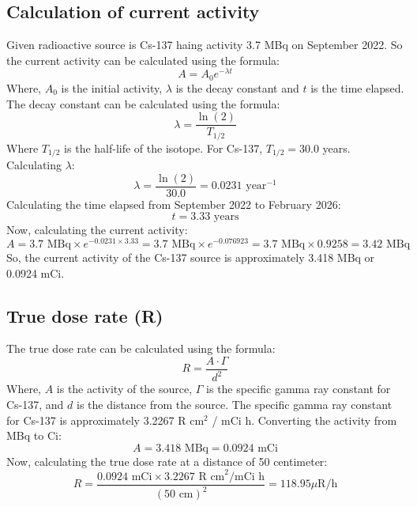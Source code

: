 \subsection{Calculation of current activity}
Given radioactive source is Cs-137 haing activity 3.7 MBq on September 2022. So the current activity can be calculated using the formula:
\begin{equation}
    A = A_0 e^{-\lambda t}
\end{equation}
Where, $A_0$ is the initial activity, $\lambda$ is the decay constant and $t$ is the time elapsed. The decay constant can be calculated using the formula:  
\begin{equation}
    \lambda = \frac{\ln(2)}{T_{1/2}}
\end{equation}
Where $T_{1/2}$ is the half-life of the isotope. For Cs-137, $T_{1/2} = 30.0$ years.
Calculating $\lambda$:
\begin{equation}
    \lambda = \frac{\ln(2)}{30.0} = 0.0231 \text{ year}^{-1}
\end{equation}
Calculating the time elapsed from September 2022 to February 2026:
\begin{equation}
    t = 3.33 \text{ years}
\end{equation}
Now, calculating the current activity:
\begin{equation}
    A = 3.7 \text{ MBq} \times e^{-0.0231 \times 3.33} = 3.7 \text{ MBq} \times e^{-0.076923} = 3.7 \text{ MBq} \times 0.9258 = 3.42 \text{ MBq}
\end{equation}
So, the current activity of the Cs-137 source is approximately 3.418 MBq or 0.0924 mCi.
\subsection{True dose rate (R)}
The true dose rate can be calculated using the formula:
\begin{equation}
    R = \frac{A \cdot \Gamma}{d^2}
\end{equation}
Where, $A$ is the activity of the source, $\Gamma$ is the specific gamma ray constant for Cs-137, and $d$ is the distance from the source. The specific gamma ray constant for Cs-137 is approximately 3.2267 R cm$^2$ / mCi h. Converting the activity from MBq to Ci:
\begin{equation}
    A = 3.418 \text{ MBq} = 0.0924 \text{ mCi}
\end{equation}
Now, calculating the true dose rate at a distance of 50 centimeter:
\begin{equation}
    R = \frac{0.0924 \text{ mCi} \times 3.2267 \text{ R cm}^2/\text{mCi h}}{(50 \text{ cm})^2} = 118.95 \text{$\mu$R/h}    
\end{equation}

